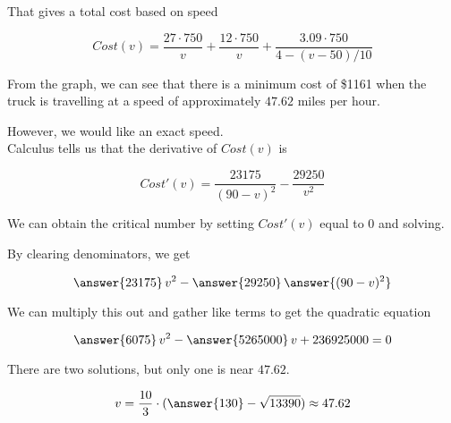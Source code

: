\documentclass{ximera}
\begin{document}
That gives a total cost based on speed

\[
Cost(v) = \frac{27 \cdot 750}{v} + \frac{12 \cdot 750}{v} + \frac{3.09 \cdot 750}{4-(v-50)/10}
\]





\begin{center}
\end{center}



From the graph, we can see that there is a minimum cost of \$1161 when the truck is travelling at a speed of approximately $47.62$ miles per hour.




However, we would like an exact speed. \\





Calculus tells us that the derivative of $Cost(v)$ is


\[
Cost'(v) = \frac{23175}{(90-v)^2} - \frac{29250}{v^2}
\]



We can obtain the critical number by setting $Cost'(v)$ equal to $0$ and solving.



By clearing denominators, we get

\[
\answer{23175} \, v^2 - \answer{29250} \, \answer{(90-v)^2}
\]


We can multiply this out and gather like terms to get the quadratic equation

\[
\answer{6075} \, v^2 - \answer{5265000} \, v + 236925000 = 0
\]



There are two solutions, but only one is near $47.62$.


\[
v = \frac{10}{3} \cdot (\answer{130} - \sqrt{13390}) \approx 47.62
\]
\end{document}
